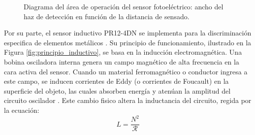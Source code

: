 \documentclass[conference]{IEEEtran}
\begin{document}
\begin{figure}[htbp]
    \centering
    \caption{Diagrama del área de operación del sensor fotoeléctrico: ancho del haz de detección en función de la distancia de sensado.}
    \label{fig:respuesta_foto}
\end{figure}

Por su parte, el sensor inductivo PR12-4DN se implementa para la discriminación especifica de elementos metálicos \cite{sensores_5}. Su principio de funcionamiento, ilustrado en la Figura \ref{fig:principio_inductivo}, se basa en la inducción electromagnética. Una bobina osciladora interna genera un campo magnético de alta frecuencia en la cara activa del sensor. Cuando un material ferromagnético o conductor ingresa a este campo, se inducen corrientes de Eddy (o corrientes de Foucault) en la superficie del objeto, las cuales absorben energía y atenúan la amplitud del circuito oscilador \cite{sensores_19}. Este cambio fisico altera la inductancia del circuito, regida por la ecuación:
\begin{equation}
    L = \frac{N^2}{\mathcal{R}}
\end{equation}
\end{document}
